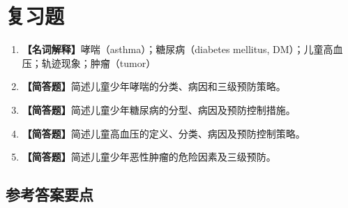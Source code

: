 \section{复习题}

\begin{enumerate}[leftmargin=*, itemsep=8pt]
    \item \textbf{【名词解释】}哮喘（asthma）；糖尿病（diabetes mellitus, DM）；儿童高血压；轨迹现象；肿瘤（tumor）
    \item \textbf{【简答题】}简述儿童少年哮喘的分类、病因和三级预防策略。
    \item \textbf{【简答题】}简述儿童少年糖尿病的分型、病因及预防控制措施。
    \item \textbf{【简答题】}简述儿童高血压的定义、分类、病因及预防控制策略。
    \item \textbf{【简答题】}简述儿童少年恶性肿瘤的危险因素及三级预防。
\end{enumerate}

\subsection*{参考答案要点}

